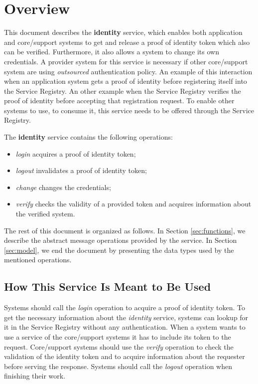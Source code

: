 \documentclass[a4paper]{arrowhead}
\begin{document}
\section{Overview}
\label{sec:overview}
This document describes the \textbf{identity} service, which enables both application and core/support systems to get and release a proof of identity token which also can be verified. Furthermore, it also allows a system to change its own credentials. A provider system for this service is necessary if other core/support system are using \textit{outsourced} authentication policy. An example of this interaction when an application system gets a proof of identity before registering itself into the Service Registry. An other example when the Service Registry verifies the proof of identity before accepting that registration request. To enable other systems to use, to consume it, this service needs to be offered through the Service Registry.

The \textbf{identity} service contains the following operations:

\begin{itemize}
    \item \textit{login} acquires a proof of identity token;
    \item \textit{logout} invalidates a proof of identity token;
    \item \textit{change} changes the credentials;
    \item \textit{verify} checks the validity of a provided token and acquires information about the verified system.
\end{itemize}

The rest of this document is organized as follows.
In Section \ref{sec:functions}, we describe the abstract message operations provided by the service.
In Section \ref{sec:model}, we end the document by presenting the data types used by the mentioned operations.

\subsection{How This Service Is Meant to Be Used}
Systems should call the \textit{login} operation to acquire a proof of identity token. To get the necessary information about the \textit{identity} service, systems can lookup for it in the Service Registry without any authentication. When a system wants to use a service of the core/support systems it has to include its token to the request. Core/support systems should use the \textit{verify} operation to check the validation of the identity token and to acquire information about the requester before serving the response. Systems should call the \textit{logout} operation when finishing their work.
\end{document}
